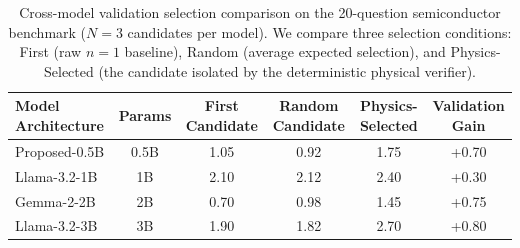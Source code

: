 \begin{table}[pos=tp]
\caption{Cross-model validation selection comparison on the 20-question semiconductor benchmark ($N=3$ candidates per model). We compare three selection conditions: First (raw $n=1$ baseline), Random (average expected selection), and Physics-Selected (the candidate isolated by the deterministic physical verifier).}
\label{tab:model_comparison}
\centering
\begin{tabularx}{\linewidth}{@{}Lccccc@{}}
\toprule
\textbf{Model Architecture} & \textbf{Params} & \textbf{First Candidate} & \textbf{Random Candidate} & \textbf{Physics-Selected} & \textbf{Validation Gain} \\
\midrule
Proposed-0.5B             & 0.5B   & 1.05                 & 0.92                 & 1.75                 & +0.70              \\
Llama-3.2-1B              & 1B     & 2.10                 & 2.12                 & 2.40                 & +0.30              \\
Gemma-2-2B                & 2B     & 0.70                 & 0.98                 & 1.45                 & +0.75              \\
Llama-3.2-3B              & 3B     & 1.90                 & 1.82                 & 2.70                 & +0.80              \\
\bottomrule
\end{tabularx}
\end{table}
